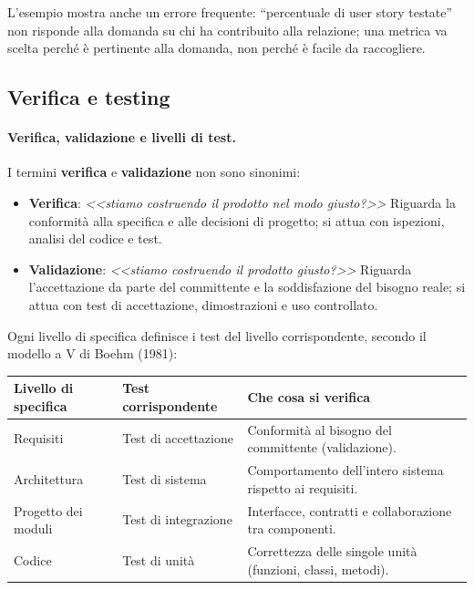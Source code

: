\documentclass[12pt]{extarticle}
\begin{document}
\noindent L'esempio mostra anche un errore frequente: ``percentuale di user story testate'' non risponde alla domanda su chi ha contribuito alla relazione; una metrica va scelta perché è pertinente alla domanda, non perché è facile da raccogliere.

\subsection{Verifica e testing}

\paragraph{Verifica, validazione e livelli di test.}
I termini \textbf{verifica} e \textbf{validazione} non sono sinonimi:

\begin{itemize}
    \item \textbf{Verifica}: \textit{<<stiamo costruendo il prodotto nel modo giusto?>>} Riguarda la conformità alla specifica e alle decisioni di progetto; si attua con ispezioni, analisi del codice e test.
    \item \textbf{Validazione}: \textit{<<stiamo costruendo il prodotto giusto?>>} Riguarda l'accettazione da parte del committente e la soddisfazione del bisogno reale; si attua con test di accettazione, dimostrazioni e uso controllato.
\end{itemize}

\noindent Ogni livello di specifica definisce i test del livello corrispondente, secondo il modello a V di Boehm (1981):

\begin{center}
\small
\begin{tabular}{p{4.2cm}p{5.2cm}p{6.4cm}}
    \toprule
    \textbf{Livello di specifica} & \textbf{Test corrispondente} & \textbf{Che cosa si verifica} \\
    \midrule
    Requisiti & Test di accettazione & Conformità al bisogno del committente (validazione). \\
    \addlinespace
    Architettura & Test di sistema & Comportamento dell'intero sistema rispetto ai requisiti. \\
    \addlinespace
    Progetto dei moduli & Test di integrazione & Interfacce, contratti e collaborazione tra componenti. \\
    \addlinespace
    Codice & Test di unità & Correttezza delle singole unità (funzioni, classi, metodi). \\
    \bottomrule
\end{tabular}
\end{center}
\end{document}
